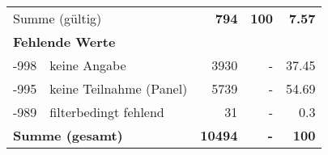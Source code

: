 \begin{longtable}{lXrrr}
     \midrule
     \multicolumn{2}{l}{Summe (gültig)} &
       \textbf{\num{794}} &
     \textbf{\num{100}} &
       \textbf{\num[round-mode=places,round-precision=2]{7.57}} \\
     \multicolumn{5}{l}{\textbf{Fehlende Werte}}\\
       -998 &
       keine Angabe &
         \num{3930} &
        - &
         \num[round-mode=places,round-precision=2]{37.45} \\
       -995 &
       keine Teilnahme (Panel) &
         \num{5739} &
        - &
         \num[round-mode=places,round-precision=2]{54.69} \\
       -989 &
       filterbedingt fehlend &
         \num{31} &
        - &
         \num[round-mode=places,round-precision=2]{0.3} \\
     \midrule
     \multicolumn{2}{l}{\textbf{Summe (gesamt)}} &
          \textbf{\num{10494}} &
        \textbf{-} &
        \textbf{\num{100}} \\
     \bottomrule
     \end{longtable}
     
